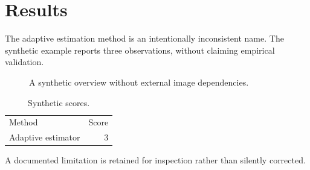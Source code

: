 \section{Results}\label{sec:results}
The adaptive estimation method is an intentionally inconsistent name.
The synthetic example reports three observations, without claiming empirical validation.
\begin{figure}[ht]
\centering{}
\caption{A synthetic overview without external image dependencies.}\label{fig:overview}
\end{figure}
\begin{table}[ht]
\centering
\begin{tabular}{lr}
Method & Score \\
Adaptive estimator & 3 \\
\end{tabular}
\caption{Synthetic scores.}\label{tab:scores}
\end{table}
A documented limitation is retained for inspection rather than silently corrected.
